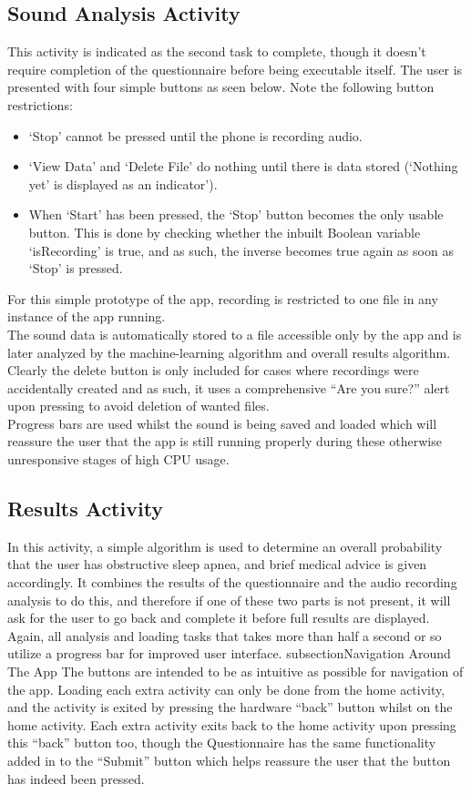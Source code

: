 \subsection{Sound Analysis Activity}
This activity is indicated as the second task to complete, though it doesn’t require completion of the questionnaire before being executable itself. The user is presented with four simple buttons as seen below. Note the following button restrictions:
\begin{itemize}
\item ‘Stop’ cannot be pressed until the phone is recording audio.
\item ‘View Data’ and ‘Delete File’ do nothing until there is data stored (‘Nothing yet’ is displayed as an indicator’).
\item When ‘Start’ has been pressed, the ‘Stop’ button becomes the only usable button. This is done by checking whether the inbuilt Boolean variable ‘isRecording’ is true, and as such, the inverse becomes true again as soon as ‘Stop’ is pressed.
\end{itemize}
For this simple prototype of the app, recording is restricted to one file in any instance of the app running.
\\ The sound data is automatically stored to a file accessible only by the app and is later analyzed by the machine-learning algorithm and overall results algorithm. Clearly the delete button is only included for cases where recordings were accidentally created and as such, it uses a comprehensive “Are you sure?” alert upon pressing to avoid deletion of wanted files.
\\Progress bars are used whilst the sound is being saved and loaded which will reassure the user that the app is still running properly during these otherwise unresponsive stages of high CPU usage. 
\subsection{Results Activity}
In this activity, a simple algorithm is used to determine an overall probability that the user has obstructive sleep apnea, and brief medical advice is given accordingly. It combines the results of the questionnaire and the audio recording analysis to do this, and therefore if one of these two parts is not present, it will ask for the user to go back and complete it before full results are displayed. Again, all analysis and loading tasks that takes more than half a second or so utilize a progress bar for improved user interface.
subsection{Navigation Around The App}
The buttons are intended to be as intuitive as possible for navigation of the app. Loading each extra activity can only be done from the home activity, and the activity is exited by pressing the hardware “back” button whilst on the home activity. Each extra activity exits back to the home activity upon pressing this “back” button too, though the Questionnaire has the same functionality added in to the “Submit” button which helps reassure the user that the button has indeed been pressed.
